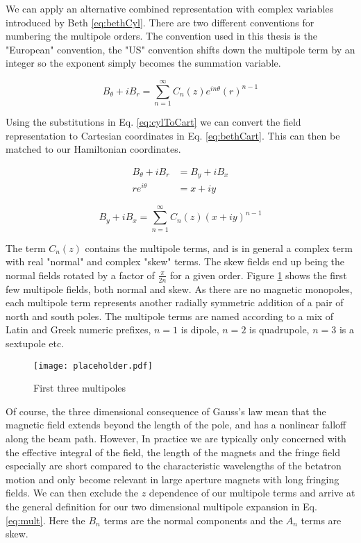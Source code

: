 We can apply an alternative combined representation with complex variables introduced by Beth \cite{Beth} \ref{eq:bethCyl}. There are two different conventions for numbering the multipole orders. The convention used in this thesis is the "European" convention, the "US" convention shifts down the multipole term by an integer so the exponent simply becomes the summation variable.

\begin{equation} \label{eq:bethCyl}
	B_{\theta} + i B_r = \sum_{n=1}^{\infty} C_n(z) e^{in\theta} \left( r \right)^{n-1}
\end{equation}

Using the substitutions in Eq. \ref{eq:cylToCart} we can convert the field representation to Cartesian coordinates in Eq. \ref{eq:bethCart}. This can then be matched to our Hamiltonian coordinates.

\begin{equation} \label{eq:cylToCart}
\begin{split}
	B_{\theta} + i B_r &= B_y + i B_x\\
	r e^{i\theta} &= x + iy
\end{split}
\end{equation}

\begin{equation} \label{eq:bethCart}
	B_y + iB_x = \sum_{n=1}^{\infty} C_n(z) (x + iy)^{n-1}
\end{equation}

The term $C_n(z)$ contains the multipole terms, and is in general a complex term with real "normal" and complex "skew" terms. The skew fields end up being the normal fields rotated by a factor of $\frac{\pi}{2n}$ for a given order. Figure \ref{fig:multipoles} shows the first few multipole fields, both normal and skew. As there are no magnetic monopoles, each multipole term represents another radially symmetric addition of a pair of north and south poles. The multipole terms are named according to a mix of Latin and Greek numeric prefixes, $n=1$ is dipole, $n=2$ is quadrupole, $n=3$ is a sextupole etc.

\begin{figure} \label{fig:multipoles}
	\centering
	\texttt{[image: placeholder.pdf]}
	\caption{First three multipoles}
\end{figure}


Of course, the three dimensional consequence of Gauss's law mean that the magnetic field extends beyond the length of the pole, and has a nonlinear falloff along the beam path. However, In practice we are typically only concerned with the effective integral of the field, the length of the magnets and the fringe field especially are short compared to the characteristic wavelengths of the betatron motion and only become relevant in large aperture magnets with long fringing fields. We can then exclude the $z$ dependence of our multipole terms and arrive at the general definition for our two dimensional multipole expansion in Eq. \ref{eq:mult}. Here the $B_n$ terms are the normal components and the $A_n$ terms are skew. 

